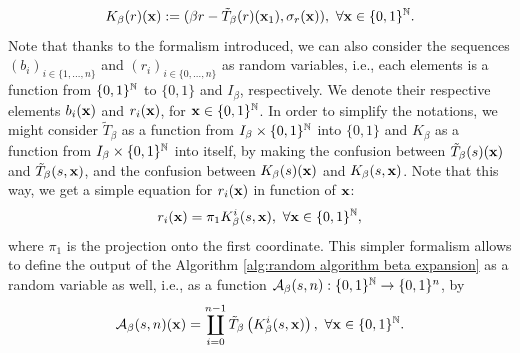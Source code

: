 \begin{equation}
    K_\beta(r)({\bf x}) := (\beta r - \tilde T_\beta(r)({\bf x}_1), \sigma_r({\bf x})),
    \ \forall {\bf x} \in \{0,1\}^{\mathbb{N}}.
\end{equation}
Note that thanks to the formalism introduced, we can also consider the sequences $(b_i)_{i \in \{1, \ldots, n\}}$ and $(r_i)_{i \in \{0, \ldots, n\}}$ as random variables, i.e., each elements is a function from $\{0,1\}^{\mathbb{N}}$ to $\{0,1\}$ and $I_\beta$, respectively. We denote their respective elements $b_i({\bf x})$ and $r_i({\bf x})$, for ${\bf x} \in \{0,1\}^{\mathbb{N}}$. In order to simplify the notations, we might consider $\tilde T_\beta$ as a function from $I_\beta \times \{0,1\}^{\mathbb{N}}$ into $\{0,1\}$ and $K_{\beta}$ as a function from $I_\beta \times \{0,1\}^{\mathbb{N}}$ into itself, by making the confusion between $\tilde T_\beta(s)({\bf x})$ and $\tilde T_\beta(s,{\bf x})$, and the confusion between $K_{\beta}(s)({\bf x})$ and $K_{\beta}(s,{\bf x})$. Note that this way, we get a simple equation for $r_i({\bf x})$ in function of ${\bf x}$:
\begin{equation}
    r_i({\bf x}) = \pi_1 K^i_\beta(s,{\bf x}), \ \forall {\bf x} \in \{0,1\}^{\mathbb{N}},
\end{equation}
where $\pi_1$ is the projection onto the first coordinate. This simpler formalism allows to define the output of the Algorithm \ref{alg:random algorithm beta expansion} as a random variable as well, i.e., as a function $\mathcal{A}_\beta(s,n) : \{0,1\}^{\mathbb{N}} \to \{0,1\}^n$, by 
\begin{equation}\label{eq:definition of the random beta expansion algorithm as a random variable}
    \mathcal{A}_\beta(s,n)({\bf x}) = \coprod_{i=0}^{n-1} \tilde T_\beta\left(K_{\beta}^i(s,{\bf x})\right), \ \forall {\bf x} \in \{0,1\}^{\mathbb{N}}.
\end{equation}

